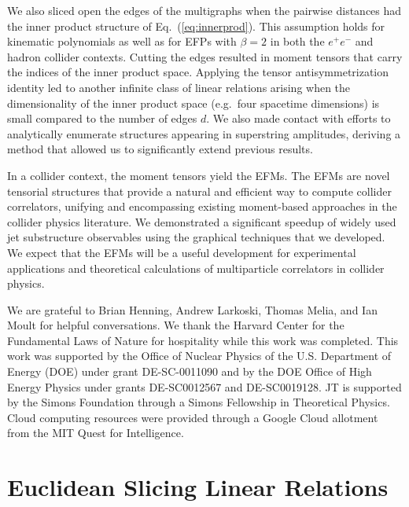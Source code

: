 \documentclass[aps,prd,floatfix,preprintnumbers,twocolumn,groupedaddress,nofootinbib,longbibliography,10pt]{revtex4-1}
\DeclareRobustCommand{\Eq}[1]{Eq.~(\ref{#1})}
\begin{document}
We also sliced open the edges of the multigraphs when the pairwise distances had the inner product structure of \Eq{eq:innerprod}.
%
This assumption holds for kinematic polynomials as well as for EFPs with $\beta=2$ in both the $e^+e^-$ and hadron collider contexts.
%
Cutting the edges resulted in moment tensors that carry the indices of the inner product space.
%
Applying the tensor antisymmetrization identity led to another infinite class of linear relations arising when the dimensionality of the inner product space (e.g.~four spacetime dimensions) is small compared to the number of edges $d$.
%
We also made contact with efforts to analytically enumerate structures appearing in superstring amplitudes, deriving a method that allowed us to significantly extend previous results.


In a collider context, the moment tensors yield the EFMs.
%
The EFMs are novel tensorial structures that provide a natural and efficient way to compute collider correlators, unifying and encompassing existing moment-based approaches in the collider physics literature.
%
We demonstrated a significant speedup of widely used jet substructure observables using the graphical techniques that we developed.
%
We expect that the EFMs will be a useful development for experimental applications and theoretical calculations of multiparticle correlators in collider physics.


\begin{acknowledgments}
%
We are grateful to Brian Henning, Andrew Larkoski, Thomas Melia, and Ian Moult for helpful conversations.
%
We thank the Harvard Center for the Fundamental Laws of Nature for hospitality while this work was completed.
%
This work was supported by the Office of Nuclear Physics of the U.S. Department of Energy (DOE) under grant DE-SC-0011090 and by the DOE Office of High Energy Physics under grants DE-SC0012567 and DE-SC0019128.
%
JT is supported by the Simons Foundation through a Simons Fellowship in Theoretical Physics.
%
Cloud computing resources were provided through a Google Cloud allotment from the MIT Quest for Intelligence.
%
\end{acknowledgments}

\appendix



\section{Euclidean Slicing Linear Relations}
\label{app:euclideanslicing}
\end{document}
